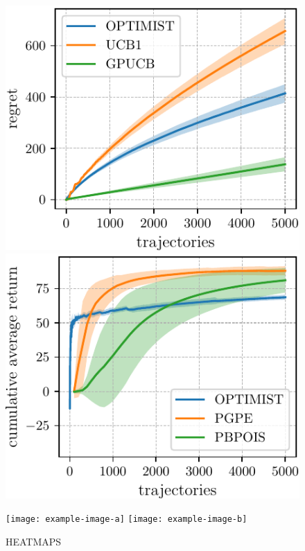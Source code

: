 \documentclass{article}
\makeatletter
\DeclareRobustCommand{\algoname}{OPTIMIST\@\xspace}
\makeatother
\begin{document}
\begin{figure}[t] 
\vskip 0.2in
  \begin{minipage}[b]{0.24\linewidth}
    \centering
    \includegraphics[width=\linewidth]{plots/LQG_mu.pdf}
    \vspace{-0.4cm}
    \caption{Cumulative regret in the LQG experiment, comparing \algoname, UCB1 and GPUCB (30 runs, 95\% c.i.)} 
    \label{fig:lqg} 
  \end{minipage}%
  \hspace{0.3cm}
  \begin{minipage}[b]{0.24\linewidth}
    \centering
    \includegraphics[width=\linewidth]{plots/MC_mu.pdf}
    \vspace{-0.4cm}
    \caption{Cumulative average return for the Mountain Car, comparing \algoname, PGPE and PB-POIS (5 runs, 95\% c.i.)} 
    \label{fig:mc} 
  \end{minipage} %
  \hspace{0.3cm}
  \begin{minipage}[b]{0.48\linewidth}
    \centering
    \texttt{[image: example-image-a]}
    \texttt{[image: example-image-b]}
    \caption{HEATMAPS} 
    \label{fig:mc} 
  \end{minipage} %
  \vskip -0.2in
\end{figure}
\end{document}
